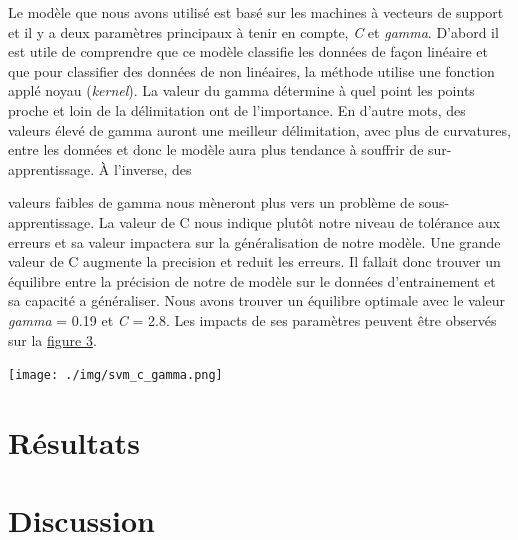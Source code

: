 \documentclass[12pt]{extarticle}
\begin{document}
Le modèle que nous avons utilisé est basé sur les machines à vecteurs de support et il y a deux paramètres principaux à tenir en compte, \emph{C} et \emph{gamma}. D'abord il est utile de comprendre que ce modèle classifie les données de façon linéaire et que pour classifier des données de non linéaires, la méthode utilise une fonction applé noyau (\emph{kernel}). La valeur du gamma détermine à quel point les points proche et loin de la délimitation ont de l'importance. En d'autre mots, des valeurs élevé de gamma auront une meilleur délimitation, avec plus de curvatures, entre les données et donc le modèle aura plus tendance à souffrir de sur-apprentissage. À l'inverse, des
\begin{minipage}{.45\textwidth}
\vspace*{2.5mm}
valeurs faibles de gamma nous mèneront plus vers un problème de sous-apprentissage. La valeur de C nous indique plutôt notre niveau de tolérance aux erreurs et sa valeur impactera sur la généralisation de notre modèle. Une grande valeur de C augmente la precision et reduit les erreurs. Il fallait donc trouver un équilibre entre la précision de notre de modèle sur le données d'entrainement et sa capacité a généraliser. Nous avons trouver un équilibre optimale avec le valeur \emph{gamma} = 0.19 et \emph{C} = 2.8. Les impacts de ses paramètres peuvent être observés sur la \hyperref[fig:svm_c_gamma]{figure 3}.
\end{minipage}
\begin{minipage}{.55\textwidth}
\vspace*{1mm}
\vspace*{-5mm}
\begin{center}
\texttt{[image: ./img/svm\_c\_gamma.png]}
\end{center}
\label{fig:svm_c_gamma}
\end{minipage}


\section{Résultats}
\label{sec:org6cd0a6f}
\section{Discussion}
\label{sec:orgd43aab5}
\end{document}
